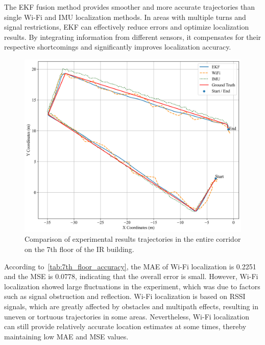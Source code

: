 \documentclass[12pt,a4paper]{article}
\numberwithin{equation}{section}
\begin{document}
The EKF fusion method provides smoother and more accurate trajectories than
single Wi-Fi and IMU localization methods. In areas with multiple turns and
signal restrictions, EKF can effectively reduce errors and optimize localization
results. By integrating information from different sensors, it compensates for
their respective shortcomings and significantly improves localization accuracy.
\begin{figure}[H]
  \centering
  \includegraphics[width=0.8\linewidth]{images/1/3.png}
  \caption{Comparison of experimental results trajectories in the entire
    corridor on the 7th floor of the IR building.}
  \label{fig:ir_full_7}
\end{figure}

According to~\autoref{tab:7th_floor_accuracy}, the MAE of Wi-Fi localization is
0.2251 and the MSE is 0.0778, indicating that the overall error is
small. However, Wi-Fi localization showed large fluctuations in the experiment,
which was due to factors such as signal obstruction and reflection. Wi-Fi
localization is based on RSSI signals, which are greatly affected by obstacles
and multipath effects, resulting in uneven or tortuous trajectories in some
areas. Nevertheless, Wi-Fi localization can still provide relatively accurate
location estimates at some times, thereby maintaining low MAE and MSE values.
\end{document}
